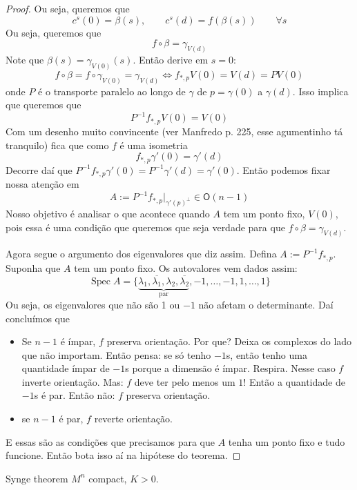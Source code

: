 \begin{proof}
Ou seja, queremos que
\[c^s(0)=\beta(s),\qquad c^s(d)=f(\beta(s))\qquad \forall s\]
Ou seja, queremos que
\[f \circ \beta=\gamma_{V(d)}\]
Note que \(\beta(s)=\gamma_{V(0)}(s)\). Então derive em \(s=0\): 
\[f \circ \beta=f\circ\gamma_{V(0)}=\gamma_{V(d)}\iff f_{*,p}V(0)=V(d)=PV(0)\]
onde \(P\) é o transporte paralelo ao longo de \(\gamma\) de \(p=\gamma(0)\) a \(\gamma(d)\).
Isso implica que queremos que
\[P^{-1}f_{*,p}V(0)=V(0)\]
Com um desenho muito convincente (ver Manfredo p. 225, esse agumentinho tá tranquilo) fica que como \(f\) é uma isometria
\[f_{*,p}\gamma'(0)=\gamma'(d)\]
Decorre daí que \(P^{-1}f_{*,p}\gamma'(0)=P^{-1}\gamma'(d)=\gamma'(0)\). Então podemos fixar nossa atenção em
\[A:=P^{-1}f_{*,p}|_{\gamma'(p)^\perp}\in \mathsf{O}(n-1)\]
Nosso objetivo é analisar o que acontece quando \(A\) tem um ponto fixo, \(V(0)\), pois essa é uma condição que queremos que seja verdade para que \(f\circ \beta = \gamma_{V(d)}\).

Agora segue o argumento dos eigenvalores que diz assim. Defina \(A:=P^{-1}f_{*,p}\). Suponha que \(A\) tem um ponto fixo. Os autovalores vem dados assim:
\[\operatorname{Spec}A=\{\underbrace{\lambda_1,\overline{\lambda_1},\lambda_2,\overline{\lambda_2}}_{\text{par} },-1,\ldots,-1,1,\ldots,1\}\]
Ou seja, os eigenvalores que não são 1 ou \(-1\) não afetam o determinante. Daí concluímos que
\begin{itemize}
\item Se \(n-1\) é ímpar, \(f\) preserva orientação. Por que? Deixa os complexos do lado que não importam. Então pensa: se só tenho \(-1\)s, então tenho uma quantidade ímpar de \(-1\)s porque a dimensão é ímpar. Respira. Nesse caso \(f\) inverte orientação. Mas: \(f\) deve ter pelo menos um \(1\)! Então a quantidade de \(-1\)s  é par. Então não: \(f\) preserva orientação.
\item se \(n-1\) é par, \(f\) reverte orientação.
\end{itemize}
E essas são as condições que precisamos para que \(A\) tenha um ponto fixo e tudo funcione. Então bota isso aí na hipótese do teorema.
\end{proof}

\begin{thing6}{Synge theorem}\leavevmode
\(M^n\) compact, \(K>0\).
\end{thing6}

